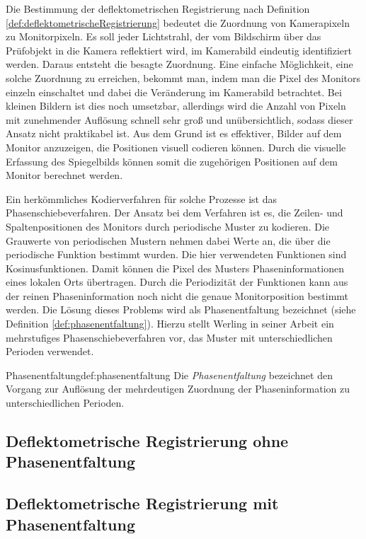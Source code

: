 Die Bestimmung der deflektometrischen Registrierung nach Definition \ref{def:deflektometrischeRegistrierung} bedeutet die Zuordnung von Kamerapixeln zu Monitorpixeln.
Es soll jeder Lichtstrahl, der vom Bildschirm über das Prüfobjekt in die Kamera reflektiert wird, im Kamerabild eindeutig identifiziert werden.
Daraus entsteht die besagte Zuordnung.
Eine einfache Möglichkeit, eine solche Zuordnung zu erreichen, bekommt man, indem man die Pixel des Monitors einzeln einschaltet und dabei die Veränderung im Kamerabild betrachtet.
Bei kleinen Bildern ist dies noch umsetzbar, allerdings wird die Anzahl von Pixeln mit zunehmender Auflösung schnell sehr groß und unübersichtlich, sodass dieser Ansatz nicht praktikabel ist.
Aus dem Grund ist es effektiver, Bilder auf dem Monitor anzuzeigen, die Positionen visuell codieren können.
Durch die visuelle Erfassung des Spiegelbilds können somit die zugehörigen Positionen auf dem Monitor berechnet werden.

\p
Ein herkömmliches Kodierverfahren für solche Prozesse ist das Phasenschiebeverfahren.
Der Ansatz bei dem Verfahren ist es, die Zeilen- und Spaltenpositionen des Monitors durch periodische Muster zu kodieren.
Die Grauwerte von periodischen Mustern nehmen dabei Werte an, die über die periodische Funktion bestimmt wurden.
Die hier verwendeten Funktionen sind Kosinusfunktionen.
Damit können die Pixel des Musters Phaseninformationen eines lokalen Orts übertragen.
Durch die Periodizität der Funktionen kann aus der reinen Phaseninformation noch nicht die genaue Monitorposition bestimmt werden.
Die Lösung dieses Problems wird als Phasenentfaltung bezeichnet (siehe Definition \ref{def:phasenentfaltung}).
Hierzu stellt Werling in seiner Arbeit \cite{kit_werling} ein mehrstufiges Phasenschiebeverfahren vor, das Muster mit unterschiedlichen Perioden verwendet.

\begin{Definition}{Phasenentfaltung}{def:phasenentfaltung}
	Die \textit{Phasenentfaltung} bezeichnet den Vorgang zur Auflösung der mehrdeutigen Zuordnung der Phaseninformation zu unterschiedlichen Perioden.
\end{Definition}

{
	\FloatBarrier
    \subsection{Deflektometrische Registrierung ohne Phasenentfaltung}
    \label{sub:registrierungOhnePhasenentfaltung}
    
}

{
	\FloatBarrier
    \subsection{Deflektometrische Registrierung mit Phasenentfaltung}
    \label{sub:registrierungMitPhasenentfaltung}
    
}